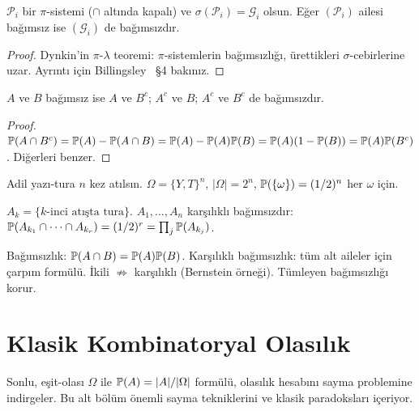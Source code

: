\begin{onerme}\label{prop:pisys_bag}
$\mathcal{P}_i$ bir $\pi$-sistemi ($\cap$ altında kapalı) ve
$\sigma(\mathcal{P}_i) = \mathcal{G}_i$ olsun. Eğer $(\mathcal{P}_i)$ ailesi
bağımsız ise $(\mathcal{G}_i)$ de bağımsızdır.
\end{onerme}

\begin{proof}
Dynkin'in $\pi$-$\lambda$ teoremi: $\pi$-sistemlerin bağımsızlığı,
ürettikleri $\sigma$-cebirlerine uzar.
Ayrıntı için Billingsley~\cite{billingsley1995} §4 bakınız.
\end{proof}

\begin{onerme}\label{prop:bag_korunma}
$A$ ve $B$ bağımsız ise $A$ ve $B^c$; $A^c$ ve $B$; $A^c$ ve $B^c$ de bağımsızdır.
\end{onerme}

\begin{proof}
$\mathbb{P}(A \cap B^c) = \mathbb{P}(A) - \mathbb{P}(A \cap B) = \mathbb{P}(A) - \mathbb{P}(A)\mathbb{P}(B)
= \mathbb{P}(A)(1 - \mathbb{P}(B)) = \mathbb{P}(A)\mathbb{P}(B^c)$.
Diğerleri benzer.
\end{proof}

\begin{ornek}\label{ex:bag_deneme}
Adil yazı-tura $n$ kez atılsın. $\Omega = \{Y,T\}^n$, $|\Omega|=2^n$,
$\mathbb{P}(\{\omega\}) = (1/2)^n$ her $\omega$ için.

$A_k = \{k\text{-inci atışta tura}\}$. $A_1, \ldots, A_n$ karşılıklı bağımsızdır:
$\mathbb{P}(A_{k_1} \cap \cdots \cap A_{k_r}) = (1/2)^r = \prod_j \mathbb{P}(A_{k_j})$.
\end{ornek}

\begin{mikroozet}[§2.5 özeti]
Bağımsızlık: $\mathbb{P}(A \cap B) = \mathbb{P}(A)\mathbb{P}(B)$.
Karşılıklı bağımsızlık: tüm alt aileler için çarpım formülü.
İkili $\not\Rightarrow$ karşılıklı (Bernstein örneği).
Tümleyen bağımsızlığı korur.
\end{mikroozet}


\section{Klasik Kombinatoryal Olasılık}

\begin{motivasyon}[§2.6]
Sonlu, eşit-olası $\Omega$ ile $\mathbb{P}(A) = |A|/|\Omega|$ formülü, olasılık
hesabını sayma problemine indirgeler. Bu alt bölüm önemli sayma tekniklerini
ve klasik paradoksları içeriyor.
\end{motivasyon}

